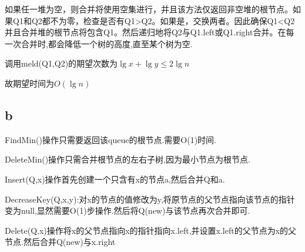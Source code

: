 \documentclass[12pt,a4paper,fontset=none]{ctexart}
\begin{document}
如果任一堆为空，则合并将使用空集进行，并且该方法仅返回非空堆的根节点。如果Q1和Q2都不为零，检查是否有Q1>Q2。如果是，交换两者。因此确保Q1<Q2并且合并堆的根节点将包含Q1。然后递归地将Q2与Q1.left或Q1.right合并。在每一次合并时,都会降低一个树的高度,直至某个树为空.

调用meld(Q1,Q2)的期望次数为$\lg x+\lg y\leq 2\lg n$

故期望时间为$O(\lg n)$

\subsection*{b}
FindMin()操作只需要返回该queue的根节点.需要O(1)时间.

DeleteMin()操作只需合并根节点的左右子树,因为最小节点为根节点.

Insert(Q,x)操作首先创建一个只含有x的节点a,然后合并Q和a.

DecreaseKey(Q,x,y):对x的节点的值修改为y,将原节点的父节点指向该节点的指针变为null,显然需要O(1)步操作.然后将Q(new)与该节点再次合并即可.

Delete(Q,x)操作将x的父节点指向x的指针指向x.left,并设置x.left的父节点为x的父节点.然后合并Q(new)与x.right
\end{document}
